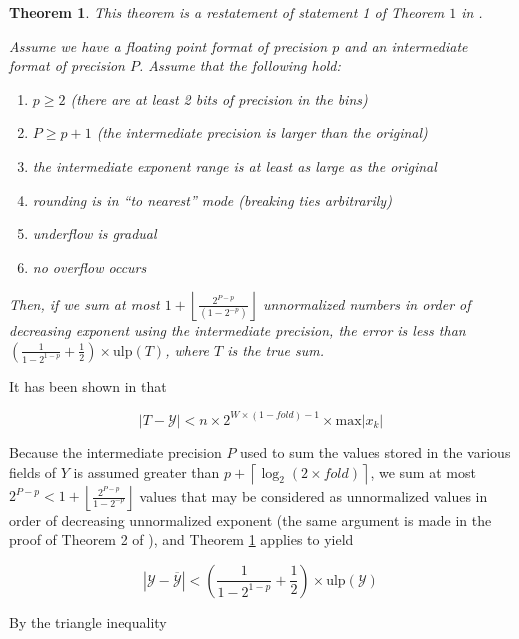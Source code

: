 \documentclass[12pt]{article}
\providecommand{\ceil}[1]{\left \lceil #1 \right \rceil }
\providecommand{\floor}[1]{\left \lfloor #1 \right \rfloor }
\providecommand{\max}{\ensuremath{\text{max}}}
\providecommand{\ulp}{\ensuremath{\text{ulp}}}
\theoremstyle{plain}
\newtheorem{thm}{Theorem}[section]
\begin{document}
    \begin{thm}
      This theorem is a restatement of statement 1 of Theorem $1$ in \cite{sortsum}.

      Assume we have a floating point format of precision $p$ and an intermediate format of precision $P$. Assume that the following hold:
      \begin{enumerate}
        \item $p \geq 2$ (there are at least 2 bits of precision in the bins)
        \item $P \geq p + 1$ (the intermediate precision is larger than the original)
        \item the intermediate exponent range is at least as large as the original
        \item rounding is in ``to nearest'' mode (breaking ties arbitrarily)
        \item underflow is gradual
        \item no overflow occurs
      \end{enumerate}
      Then, if we sum at most $1 + \floor{\frac{2^{P - p}}{(1 - 2^{-p})}}$ unnormalized numbers in order of decreasing exponent using the intermediate precision, the error is less than $(\frac{1}{1 - 2^{1 - p}} + \frac{1}{2})\times \ulp(T)$, where $T$ is the true sum.
      \label{thm:sortsum}
    \end{thm}

    It has been shown in \cite{repsum} that

    \begin{equation}
      \label{eq:repbound}
      |T - \mathcal{Y}| < n \times 2^{W \times (1 - fold) - 1} \times \max|x_k|
    \end{equation}

    Because the intermediate precision $P$ used to sum the values stored in the various fields of $Y$ is assumed greater than $p + \ceil{\log_2(2 \times fold)}$, we sum at most $2^{P - p} < 1 + \floor{\frac{2^{P - p}}{1 - 2^{-p}}}$ values that may be considered as unnormalized values in order of decreasing unnormalized exponent (the same argument is made in the proof of Theorem 2 of \cite{sortsum}), and Theorem \ref{thm:sortsum} applies to yield

    \begin{equation*}
      |\mathcal{Y} - \overline{\mathcal{Y}}| < (\frac{1}{1 - 2^{1 - p}} + \frac{1}{2})\times \ulp(\mathcal{Y})
    \end{equation*}

    By the triangle inequality
\end{document}
